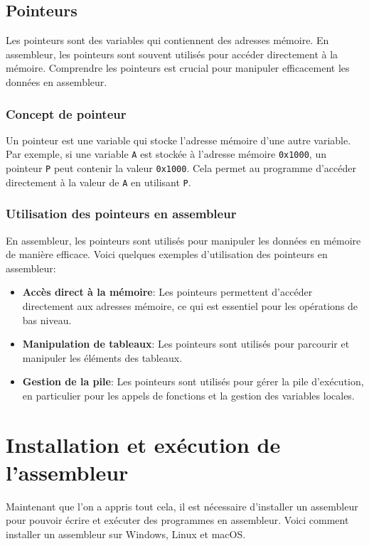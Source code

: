\documentclass[a4paper, 12pt]{report}
\begin{document}
\section{Pointeurs}
Les pointeurs sont des variables qui contiennent des adresses mémoire. En assembleur, les pointeurs sont souvent utilisés pour accéder directement à la mémoire. Comprendre les pointeurs est crucial pour manipuler efficacement les données en assembleur.

\subsection{Concept de pointeur}
Un pointeur est une variable qui stocke l'adresse mémoire d'une autre variable. Par exemple, si une variable \texttt{A} est stockée à l'adresse mémoire \texttt{0x1000}, un pointeur \texttt{P} peut contenir la valeur \texttt{0x1000}. Cela permet au programme d'accéder directement à la valeur de \texttt{A} en utilisant \texttt{P}.

\subsection{Utilisation des pointeurs en assembleur}
En assembleur, les pointeurs sont utilisés pour manipuler les données en mémoire de manière efficace. Voici quelques exemples d'utilisation des pointeurs en assembleur:

\begin{itemize}
  \item \textbf{Accès direct à la mémoire}: Les pointeurs permettent d'accéder directement aux adresses mémoire, ce qui est essentiel pour les opérations de bas niveau.
  \item \textbf{Manipulation de tableaux}: Les pointeurs sont utilisés pour parcourir et manipuler les éléments des tableaux.
  \item \textbf{Gestion de la pile}: Les pointeurs sont utilisés pour gérer la pile d'exécution, en particulier pour les appels de fonctions et la gestion des variables locales.
\end{itemize}



\chapter{Installation et exécution de l'assembleur}
Maintenant que l'on a appris tout cela, il est nécessaire d'installer un assembleur pour pouvoir écrire et exécuter des programmes en assembleur. Voici comment installer un assembleur sur Windows, Linux et macOS.
\end{document}
